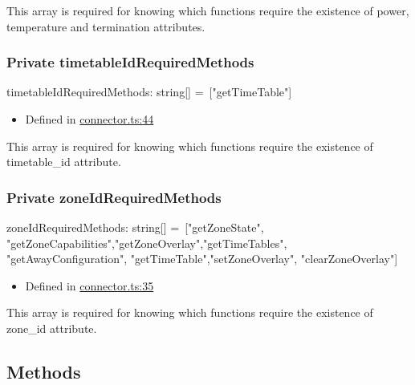 \documentclass[]{article}
\providecommand{\tightlist}{%
  \setlength{\itemsep}{0pt}\setlength{\parskip}{0pt}}
\begin{document}
This array is required for knowing which functions require the existence
of power, temperature and termination attributes.

\protect\hypertarget{timetableidrequiredmethods}{}{}

\hypertarget{private-timetableidrequiredmethods}{%
\subsubsection{\texorpdfstring{{Private}
timetableIdRequiredMethods}{Private timetableIdRequiredMethods}}\label{private-timetableidrequiredmethods}}

timetableIdRequiredMethods{:} {string}{{[}{]}}{ =~{[}"getTimeTable"{]}}

\begin{itemize}
\tightlist
\item
  Defined in
  \href{https://github.com/BFMBFramework/TadoConnector/blob/f05932b/src/connector.ts\#L44}{connector.ts:44}
\end{itemize}

This array is required for knowing which functions require the existence
of timetable\_id attribute.

\protect\hypertarget{zoneidrequiredmethods}{}{}

\hypertarget{private-zoneidrequiredmethods}{%
\subsubsection{\texorpdfstring{{Private}
zoneIdRequiredMethods}{Private zoneIdRequiredMethods}}\label{private-zoneidrequiredmethods}}

zoneIdRequiredMethods{:} {string}{{[}{]}}{ =~{[}"getZoneState",
"getZoneCapabilities","getZoneOverlay","getTimeTables",
"getAwayConfiguration", "getTimeTable","setZoneOverlay",
"clearZoneOverlay"{]}}

\begin{itemize}
\tightlist
\item
  Defined in
  \href{https://github.com/BFMBFramework/TadoConnector/blob/f05932b/src/connector.ts\#L35}{connector.ts:35}
\end{itemize}

This array is required for knowing which functions require the existence
of zone\_id attribute.

\hypertarget{methods-1}{%
\subsection{Methods}\label{methods-1}}
\end{document}
